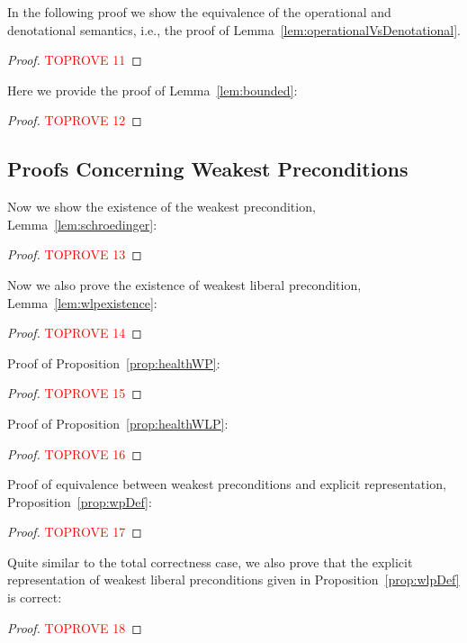 \documentclass[a4paper,UKenglish,cleveref, autoref, thm-restate]{lipics-v2021}
\begin{document}
In the following proof we show the equivalence of the operational and denotational semantics, i.e., the proof of Lemma~\ref{lem:operationalVsDenotational}.
\begin{proof}\textcolor{red}{TOPROVE 11}\end{proof}

Here we provide the proof of Lemma~\ref{lem:bounded}:
\begin{proof}\textcolor{red}{TOPROVE 12}\end{proof}

\subsection{Proofs Concerning Weakest Preconditions}
\label{app:wp}

Now we show the existence of the weakest precondition, Lemma~\ref{lem:schroedinger}:
\begin{proof}\textcolor{red}{TOPROVE 13}\end{proof}

Now we also prove the existence of weakest liberal precondition, Lemma~\ref{lem:wlpexistence}:
\begin{proof}\textcolor{red}{TOPROVE 14}\end{proof}


Proof of Proposition~\ref{prop:healthWP}:
\begin{proof}\textcolor{red}{TOPROVE 15}\end{proof}

Proof of Proposition~\ref{prop:healthWLP}:
\begin{proof}\textcolor{red}{TOPROVE 16}\end{proof}

Proof of equivalence between weakest preconditions and explicit representation, Proposition~\ref{prop:wpDef}:
\begin{proof}\textcolor{red}{TOPROVE 17}\end{proof}

Quite similar to the total correctness case, we also prove that the explicit representation of weakest liberal preconditions given in Proposition~\ref{prop:wlpDef} is correct:
\begin{proof}\textcolor{red}{TOPROVE 18}\end{proof}
\end{document}
